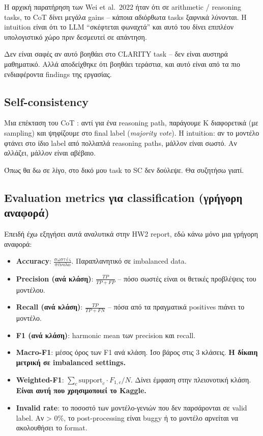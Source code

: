 \documentclass[12pt]{fphw}
\begin{document}
Η αρχική παρατήρηση των Wei et al.\ 2022 ήταν ότι σε arithmetic / reasoning tasks, το CoT δίνει μεγάλα gains -- κάποια αδιόρθωτα tasks ξαφνικά λύνονται. Η intuition είναι ότι το LLM ``σκέφτεται φωναχτά'' και αυτό του δίνει επιπλέον υπολογιστικό χώρο πριν δεσμευτεί σε απάντηση.

Δεν είναι σαφές αν αυτό βοηθάει στο CLARITY task -- δεν είναι αυστηρά μαθηματικό. Αλλά αποδείχθηκε ότι βοηθάει τεράστια, και αυτό είναι από τα πιο ενδιαφέροντα findings της εργασίας.

\subsection{Self-consistency}

Μια επέκταση του CoT \cite{wang2023selfconsistency}: αντί για ένα reasoning path, παράγουμε K διαφορετικά (με sampling) και ψηφίζουμε στο final label (\emph{majority vote}). Η intuition: αν το μοντέλο φτάνει στο ίδιο label από πολλαπλά reasoning paths, μάλλον είναι σωστό. Αν αλλάζει, μάλλον είναι αβέβαιο.

Όπως θα δω σε λίγο, στο δικό μου task το SC δεν δούλεψε. Θα συζητήσω γιατί.

\subsection{Evaluation metrics για classification (γρήγορη αναφορά)}

Επειδή έχω εξηγήσει αυτά αναλυτικά στην HW2 report, εδώ κάνω μόνο μια γρήγορη αναφορά:

\begin{itemize}
    \item \textbf{Accuracy}: $\frac{\text{σωστές}}{\text{σύνολο}}$. Παραπλανητικό σε imbalanced data.
    \item \textbf{Precision (ανά κλάση)}: $\frac{TP}{TP+FP}$ -- πόσο σωστές είναι οι θετικές προβλέψεις του μοντέλου.
    \item \textbf{Recall (ανά κλάση)}: $\frac{TP}{TP+FN}$ -- πόσα από τα πραγματικά positives πιάνει το μοντέλο.
    \item \textbf{F1 (ανά κλάση)}: harmonic mean των precision και recall.
    \item \textbf{Macro-F1}: μέσος όρος των F1 ανά κλάση. Ίσο βάρος στις 3 κλάσεις. \textbf{Η δίκαιη μετρική σε imbalanced settings.}
    \item \textbf{Weighted-F1}: $\sum_c \text{support}_c \cdot F_{1,c} / N$. Δίνει έμφαση στην πλειονοτική κλάση. \textbf{Είναι αυτή που χρησιμοποιεί το Kaggle.}
    \item \textbf{Invalid rate}: το ποσοστό των μοντέλο-γενιών που δεν παρσάρονται σε valid label. Αν > 0\%, το post-processing είναι buggy ή το μοντέλο αρνείται να ακολουθήσει το format.
\end{itemize}
\end{document}
